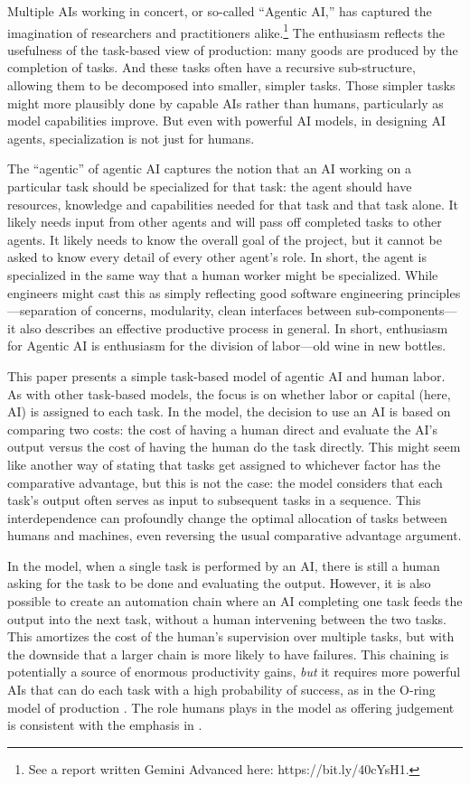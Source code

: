 \documentclass{article}
\begin{document}
Multiple AIs working in concert, or so-called ``Agentic AI,'' has captured the imagination of researchers and practitioners alike.\footnote{See a report written Gemini Advanced here: https://bit.ly/40cYsH1.}
The enthusiasm reflects the usefulness of the task-based view of production: many goods are produced by the completion of tasks.
And these tasks often have a recursive sub-structure, allowing them to be decomposed into smaller, simpler tasks.
Those simpler tasks might more plausibly done by capable AIs rather than humans, particularly as model capabilities improve.
But even with powerful AI models, in designing AI agents, specialization is not just for humans.

The ``agentic'' of agentic AI captures the notion that an AI working on a particular task should be specialized for that task: 
the agent should have resources, knowledge and capabilities needed for that task and that task alone.
It likely needs input from other agents and will pass off completed tasks to other agents.
It likely needs to know the overall goal of the project, but it cannot be asked to know every detail of every other agent's role.
In short, the agent is specialized in the same way that a human worker might be specialized. 
While engineers might cast this as simply reflecting good software engineering principles---separation of concerns, modularity, clean interfaces between sub-components---it also describes an effective productive process in general.
In short, enthusiasm for Agentic AI is enthusiasm for the division of labor---old wine in new bottles. 

This paper presents a simple task-based model of agentic AI and human labor.
As with other task-based models, the focus is on whether labor or capital (here, AI) is assigned to each task.
In the model, the decision to use an AI is based on comparing two costs: the cost of having a human direct and evaluate the AI's output versus the cost of having the human do the task directly.
This might seem like another way of stating that tasks get assigned to whichever factor has the comparative advantage, but this is not the case:
the model considers that each task's output often serves as input to subsequent tasks in a sequence.
This interdependence can profoundly change the optimal allocation of tasks between humans and machines, even reversing the usual comparative advantage argument.

In the model, when a single task is performed by an AI, there is still a human asking for the task to be done and evaluating the output.
However, it is also possible to create an automation chain where an AI completing one task feeds the output into the next task, without a human intervening between the two tasks.
This amortizes the cost of the human's supervision over multiple tasks, but with the downside that a larger chain is more likely to have failures.
This chaining is potentially a source of enormous productivity gains, \emph{but} it requires more powerful AIs that can do each task with a high probability of success, as in the O-ring model of production \citep{kremer1993}.
The role humans plays in the model as offering judgement is consistent with the emphasis in \cite{agrawal2019exploring}.
\end{document}
